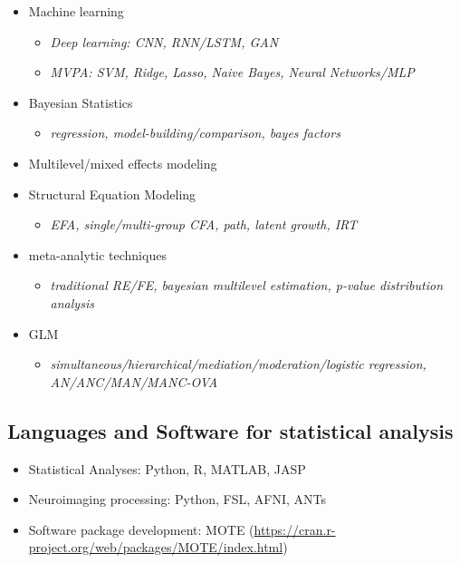 \documentclass[11pt, a4paper]{awesome-cv}
\providecommand{\tightlist}{%
	\setlength{\itemsep}{0pt}\setlength{\parskip}{0pt}}
\begin{document}
\begin{itemize}
\tightlist
\item
  Machine learning

  \begin{itemize}
  \tightlist
  \item
    \emph{Deep learning: CNN, RNN/LSTM, GAN}
  \item
    \emph{MVPA: SVM, Ridge, Lasso, Naive Bayes, Neural Networks/MLP}
  \end{itemize}
\item
  Bayesian Statistics

  \begin{itemize}
  \tightlist
  \item
    \emph{regression, model-building/comparison, bayes factors}
  \end{itemize}
\item
  Multilevel/mixed effects modeling
\item
  Structural Equation Modeling

  \begin{itemize}
  \tightlist
  \item
    \emph{EFA, single/multi-group CFA, path, latent growth, IRT}
  \end{itemize}
\item
  meta-analytic techniques

  \begin{itemize}
  \tightlist
  \item
    \emph{traditional RE/FE, bayesian multilevel estimation, p-value distribution analysis}
  \end{itemize}
\item
  GLM

  \begin{itemize}
  \tightlist
  \item
    \emph{simultaneous/hierarchical/mediation/moderation/logistic regression, AN/ANC/MAN/MANC-OVA}
  \end{itemize}
\end{itemize}

\hypertarget{languages-and-software-for-statistical-analysis}{%
\subsection{Languages and Software for statistical analysis}\label{languages-and-software-for-statistical-analysis}}

\begin{itemize}
\tightlist
\item
  Statistical Analyses: Python, R, MATLAB, JASP
\item
  Neuroimaging processing: Python, FSL, AFNI, ANTs
\item
  Software package development: MOTE (\url{https://cran.r-project.org/web/packages/MOTE/index.html})
\end{itemize}
\end{document}
